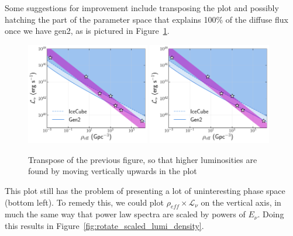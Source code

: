Some suggestions for improvement include transposing the plot and possibly hatching the part of the parameter space that explains 100\% of the diffuse flux once we have gen2, as is pictured in Figure~\ref{fig:rotate_transposed}.

\begin{figure}[htb]
    \centering
    \includegraphics[width=0.48\textwidth]{figures/rotated_phase_space/lumi_density_rotated.pdf}
    \includegraphics[width=0.48\textwidth]{figures/rotated_phase_space/lumi_density_hatched_rotated.pdf}
    \caption[Transpose of luminosity density plane]{Transpose of the previous figure, so that higher luminosities are found by moving vertically upwards in the plot}
    \label{fig:rotate_transposed}
\end{figure}

This plot still has the problem of presenting a lot of uninteresting phase space (bottom left). To remedy this, we could plot $\rho_{eff}\times \mathcal{L}_{\nu}$ on the vertical axis, in much the same way that power law spectra are scaled by powers of $E_{\nu}$. Doing this results in Figure~\ref{fig:rotate_scaled_lumi_density}.

